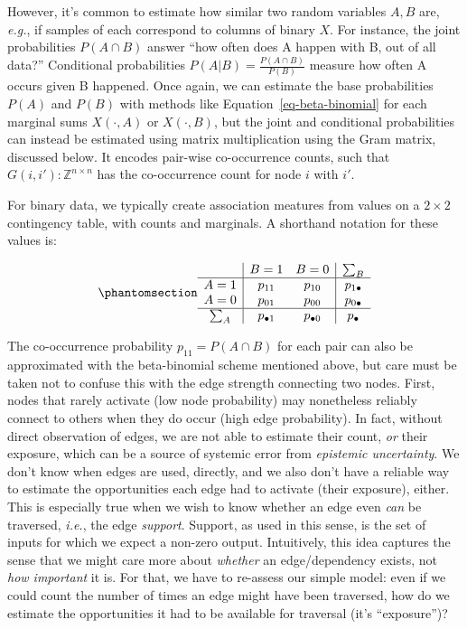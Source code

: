 \documentclass[%
	12pt,
		oneside,
		letterpaper
]{book}
\begin{document}
However, it's common to estimate how similar two random variables \(A,B\) are, \emph{e.g.}, if samples of each correspond to columns of binary \(X\).
For instance, the joint probabilities \(P(A\cap B)\) answer ``how often does A happen with B, out of all data?''
Conditional probabilities \(P(A|B)=\frac{P(A\cap B)}{P(B)}\) measure how often A occurs given B happened.
Once again, we can estimate the base probabilities \(P(A)\) and \(P(B)\) with methods like Equation~\ref{eq-beta-binomial} for each marginal sums \(X(\cdot,A)\) or \(X(\cdot,B)\), but the joint and conditional probabilities can instead be estimated using matrix multiplication using the Gram matrix, discussed below.
It encodes pair-wise co-occurrence counts, such that \(G(i,i'):\mathbb{Z}^{n\times n}\) has the co-occurrence count for node \(i\) with \(i'\).

For binary data, we typically create association meatures from values on a \(2\times2\) contingency table, with counts and marginals.
A shorthand notation for these values is:

\begin{equation}\phantomsection\label{eq-contingency}{
\begin{array}{c|cc|c}
      & B=1         & B=0         & \sum_B \\
\hline 
A=1   & p_{11}      & p_{10}      & p_{1\bullet} \\
A=0   & p_{01}      & p_{00}      & p_{0\bullet} \\
\hline 
\sum_A   & p_{\bullet 1} & p_{\bullet 0} & p_\bullet \\
\end{array}
}\end{equation}

The co-occurrence probability \(p_{11}=P(A\cap B)\) for each pair can also be approximated with the beta-binomial scheme mentioned above, but care must be taken not to confuse this with the edge strength connecting two nodes.
First, nodes that rarely activate (low node probability) may nonetheless reliably connect to others when they do occur (high edge probability).
In fact, without direct observation of edges, we are not able to estimate their count, \emph{or} their exposure, which can be a source of systemic error from \emph{epistemic uncertainty}.
We don't know when edges are used, directly, and we also don't have a reliable way to estimate the opportunities each edge had to activate (their exposure), either.
This is especially true when we wish to know whether an edge even \emph{can} be traversed, \emph{i.e.}, the edge \emph{support}.
Support, as used in this sense, is the set of inputs for which we expect a non-zero output.
Intuitively, this idea captures the sense that we might care more about \emph{whether} an edge/dependency exists, not \emph{how important} it is.
For that, we have to re-assess our simple model: even if we could count the number of times an edge might have been traversed, how do we estimate the opportunities it had to be available for traversal (it's ``exposure'')?
\end{document}
